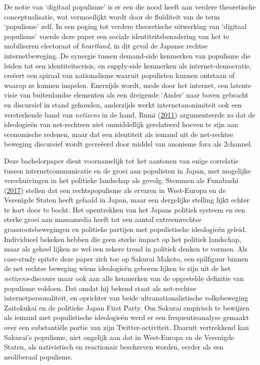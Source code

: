 \documentclass[10.5pt,dutch,]{article}
\begin{document}
De notie van `digitaal populisme' is er een die nood heeft aan verdere
theoretische conceptualisatie, wat vermoeilijkt wordt door de fluïditeit
van de term `populisme' zelf. In een poging tot verdere theoretische
uitwerking van `digitaal populisme' voerde deze paper een sociale
identiteitsbenadering van het te mobiliseren electoraat of
\emph{heartland}, in dit geval de Japanse rechtse internetbeweging. De
synergie tussen demand-side kenmerken van populisme die leiden tot een
identiteitscrisis, en supply-side kenmerken als internet-democratie,
creëert een spiraal van nationalisme waaruit populisten kunnen ontstaan
of waarop ze kunnen inspelen. Enerzijds wordt, mede door het internet,
een latente visie van buitenlandse elementen als een dreigende `Ander'
naar boven gebracht en discursief in stand gehouden, anderzijds werkt
internetanonimiteit ook een versterkende band van \emph{netizens} in de
hand. Rumi (\protect\hyperlink{ref-rumiux5fkoreansux5f2011}{2011})
argumenteerde zo dat de ideologieën van net-rechtsen niet onmiddellijk
gerelateerd hoeven te zijn aan economische redenen, maar dat een
identiteit als iemand uit de net-rechtse beweging discursief wordt
gecreëerd door middel van anonieme fora als 2channel.

Deze bachelorpaper dient voornamelijk tot het aantonen van enige
correlatie tussen internetcommunicatie en de groei aan populisten in Japan, met
mogelijke verschuivingen in het politieke landschap als gevolg. Stemmen
als Funabashi (\protect\hyperlink{ref-funabashiux5fjapanux5f2017}{2017})
stellen dat een rechtspopulisme als ervaren in West-Europa en de
Verenigde Staten heeft gefaald in Japan, maar een dergelijke stelling
lijkt echter te kort door te bocht. Het opentrekken van het Japans
politiek systeem en een sterke groei aan massamedia heeft tot een aantal
extreemrechtse grassrootsbewegingen en politieke partijen met
populistische ideologieën geleid. Individueel bekeken hebben die geen
sterke impact op het politiek landschap, maar als geheel lijken ze wel
een zekere trend in politiek denken te vormen. Als case-study spitste
deze paper zich toe op Sakurai Makoto, een spilfiguur binnen de net
rechtse beweging wiens ideologieën geboren lijken te zijn uit de het
\emph{netizens}-discours maar ook aan alle kenmerken van de opgestelde
definitie van populisme voldoen. Dat omdat hij bekend staat als net-rechtse internetpersonaliteit, en oprichter van beide
ultranationalistische volksbeweging Zaitokukai en de politieke Japan
First Party. Om Sakurai empirisch te bewijzen als iemand met
populistische ideologieën werd er een frequentieanalyse gemaakt over een
substantiële portie van zijn Twitter-activiteit. Daaruit vertrekkend kan
Sakurai's populisme, niet ongelijk aan dat in West-Europa en de
Verenigde Staten, als nativistisch en reactionair beschreven worden,
eerder als een neoliberaal populisme.
\end{document}
